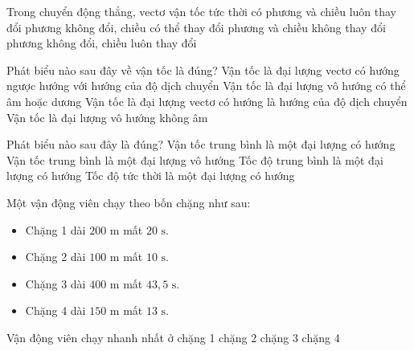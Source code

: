 \begin{ex} Trong chuyển động thẳng, vectơ vận tốc tức thời có
\choice
{phương và chiều luôn thay đổi}
{phương không đổi, chiều có thể thay đổi}
{\True phương và chiều không thay đổi}
{phương không đổi, chiều luôn thay đổi}
\end{ex}

\begin{ex} Phát biểu nào sau đây về vận tốc là đúng?
\choice
{Vận tốc là đại lượng vectơ có hướng ngược hướng với hướng của độ dịch chuyển}
{Vận tốc là đại lượng vô hướng có thể âm hoặc dương}
{\True Vận tốc là đại lượng vectơ có hướng là hướng của độ dịch chuyển}
{Vận tốc là đại lượng vô hướng không âm}
\end{ex}

\begin{ex} Phát biểu nào sau đây là đúng?
\choice
{\True Vận tốc trung bình là một đại lượng có hướng}
{Vận tốc trung bình là một đại lượng vô hướng}
{Tốc độ trung bình là một đại lượng có hướng}
{Tốc độ tức thời là một đại lượng có hướng}
\end{ex}

\begin{ex} Một vận động viên chạy theo bốn chặng như sau:
\begin{itemize}
    \item Chặng 1 dài $200\text{ m}$ mất $20\text{ s}$.
    \item Chặng 2 dài $100\text{ m}$ mất $10\text{ s}$.
    \item Chặng 3 dài $400\text{ m}$ mất $43{,}5\text{ s}$.
    \item Chặng 4 dài $150\text{ m}$ mất $13\text{ s}$.
\end{itemize}
Vận động viên chạy nhanh nhất ở
\choice
{chặng 1}
{chặng 2}
{chặng 3}
{\True chặng 4}
\end{ex}

